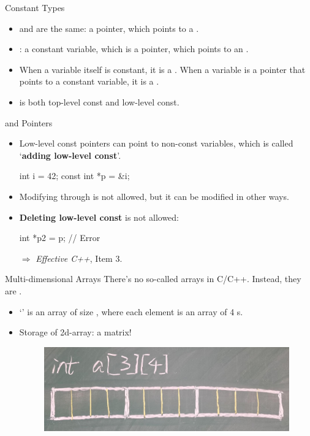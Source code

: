 \documentclass{beamer}
\begin{document}
\begin{frame}{Constant Types}
	\begin{itemize}
		\item {} and  are the same: a pointer, which points to a  .
		\item {}: a constant variable, which is a pointer, which points to an .
		\pause
		\item When a variable itself is constant, it is a . When a variable is a pointer that points to a constant variable, it is a .
		\item {} is both top-level const and low-level const.
	\end{itemize}
\end{frame}

\begin{frame}[fragile]{ and Pointers}
	\begin{itemize}
		\item Low-level const pointers can point to non-const variables, which is called `\textbf{adding low-level const}'.
		\begin{cpp}
int i = 42;
const int *p = &i;
		\end{cpp}
		\item Modifying  through  is not allowed, but it can be modified in other ways.
		\pause
		\item \textbf{Deleting low-level const} is not allowed:
		\begin{cpp}
int *p2 = p; // Error
		\end{cpp}
		\pause
		\item[\(\Rightarrow\)] \textit{Effective C++}, Item 3.
	\end{itemize}
\end{frame}

\begin{frame}{Multi-dimensional Arrays}
	There's no so-called  arrays in C/C++. Instead, they are .
	\begin{itemize}
		\item {} `' is an array of size , where each element is an array of 4 s.
		\pause
		\item Storage of 2d-array:  a matrix!
		\begin{figure}[h]
			\centering
			\includegraphics[scale=0.2]{img/2darray.jpg}
		\end{figure}
	\end{itemize}
\end{frame}
\end{document}
